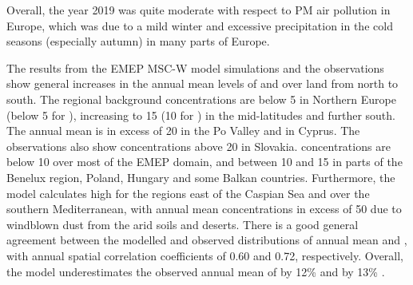 Overall, the year 2019 was quite moderate with respect to PM air pollution in Europe, which was due to a mild winter and excessive precipitation in the cold seasons (especially autumn) in many parts of Europe. %

The results from the EMEP MSC-W model simulations and the observations show general increases in the annual mean levels of \PM[10] and \PM[2.5] over land from north to south. The regional background \PM[10] concentrations are below 5 \ug in Northern Europe (below 5 \ug for \PM[2.5]), increasing to 15 \ug (10 \ug for \PM[2.5]) in the mid-latitudes and further south. The annual mean \PM[10] is in excess of 20 \ug in the Po Valley and in Cyprus. The observations also show \PM[10] concentrations above 20 \ug in Slovakia. \PM[2.5] concentrations are below 10 \ug over most of the EMEP domain, and between 10 and 15 \ug in parts of the Benelux region, Poland, Hungary and some Balkan countries. Furthermore, the model calculates high \PM[10] for the regions east of the Caspian Sea and over the southern Mediterranean, with annual mean concentrations in excess of 50 \ug due to windblown dust from the arid soils and deserts. There is a good general agreement between the modelled and observed distributions of annual mean \PM[10] and \PM[2.5], with annual spatial correlation coefficients of 0.60 and 0.72, respectively. Overall, the model underestimates the observed annual mean of \PM[10] by 12\% and \PM[2.5] by 13\% .


